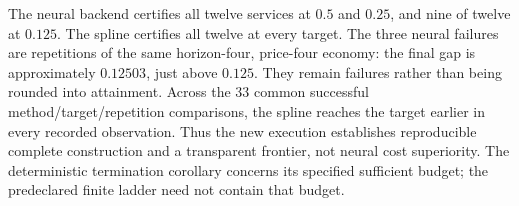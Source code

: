 The neural backend certifies all twelve services at $0.5$ and $0.25$, and nine of twelve at $0.125$. The spline certifies all twelve at every target. The three neural failures are repetitions of the same horizon-four, price-four economy: the final gap is approximately $0.12503$, just above $0.125$. They remain failures rather than being rounded into attainment. Across the 33 common successful method/target/repetition comparisons, the spline reaches the target earlier in every recorded observation. Thus the new execution establishes reproducible complete construction and a transparent frontier, not neural cost superiority. The deterministic termination corollary concerns its specified sufficient budget; the predeclared finite ladder need not contain that budget.
